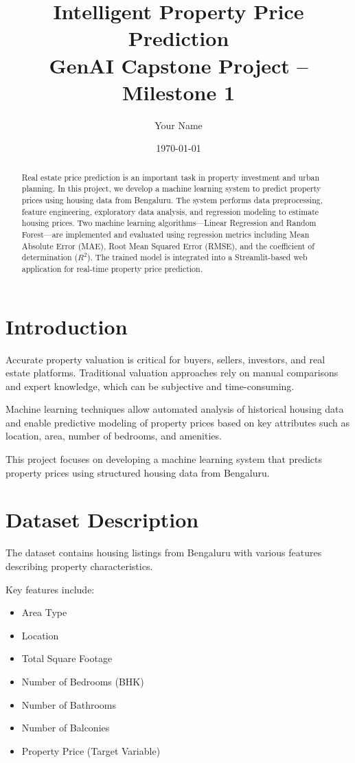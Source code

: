 \documentclass[12pt]{article}
\title{Intelligent Property Price Prediction \\ \large GenAI Capstone Project – Milestone 1}
\author{Your Name}
\date{\today}
\begin{document}
\maketitle

\begin{abstract}

Real estate price prediction is an important task in property investment and urban planning. In this project, we develop a machine learning system to predict property prices using housing data from Bengaluru. The system performs data preprocessing, feature engineering, exploratory data analysis, and regression modeling to estimate housing prices. Two machine learning algorithms—Linear Regression and Random Forest—are implemented and evaluated using regression metrics including Mean Absolute Error (MAE), Root Mean Squared Error (RMSE), and the coefficient of determination ($R^2$). The trained model is integrated into a Streamlit-based web application for real-time property price prediction.

\end{abstract}

\section{Introduction}

Accurate property valuation is critical for buyers, sellers, investors, and real estate platforms. Traditional valuation approaches rely on manual comparisons and expert knowledge, which can be subjective and time-consuming.

Machine learning techniques allow automated analysis of historical housing data and enable predictive modeling of property prices based on key attributes such as location, area, number of bedrooms, and amenities.

This project focuses on developing a machine learning system that predicts property prices using structured housing data from Bengaluru.

\section{Dataset Description}

The dataset contains housing listings from Bengaluru with various features describing property characteristics.

Key features include:

\begin{itemize}
\item Area Type
\item Location
\item Total Square Footage
\item Number of Bedrooms (BHK)
\item Number of Bathrooms
\item Number of Balconies
\item Property Price (Target Variable)
\end{itemize}
\end{document}
